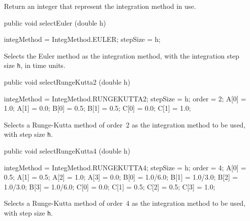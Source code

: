  \begin{tabb}  Return an integer that represent the integration method in use.
 \end{tabb}
\begin{htmlonly}
\end{htmlonly}
\begin{code}

   public void selectEuler (double h)\begin{hide} {
      integMethod = IntegMethod.EULER;
      stepSize = h;
   }\end{hide}
\end{code}
 \begin{tabb}  Selects the Euler method as the integration method,
  with the integration step size \texttt{h}, in time units.
 \end{tabb}
\begin{htmlonly}
\end{htmlonly}
\begin{code}

   public void selectRungeKutta2 (double h)\begin{hide} {
      integMethod = IntegMethod.RUNGEKUTTA2;
      stepSize = h;
      order = 2;
      A[0] = 1.0;  A[1] = 0.0;
      B[0] = 0.5;  B[1] = 0.5;
      C[0] = 0.0;  C[1] = 1.0;
   }\end{hide}
\end{code}
 \begin{tabb}  Selects a Runge-Kutta method of order~2 as the integration
  method to be used, with step size \texttt{h}.
 \end{tabb}
\begin{htmlonly}
\end{htmlonly}
\begin{code}

   public void selectRungeKutta4 (double h)\begin{hide} {
      integMethod = IntegMethod.RUNGEKUTTA4;
      stepSize = h;
      order = 4;
      A[0] = 0.5;  A[1] = 0.5;  A[2] = 1.0;  A[3] = 0.0;
      B[0] = 1.0/6.0;   B[1] = 1.0/3.0;
      B[2] = 1.0/3.0;   B[3] = 1.0/6.0;
      C[0] = 0.0;  C[1] = 0.5;  C[2] = 0.5;  C[3] = 1.0;
   }\end{hide}
\end{code}
 \begin{tabb}  Selects a Runge-Kutta method of order~4 as the integration
  method to be used, with step size \texttt{h}.
 \end{tabb}
\begin{htmlonly}
\end{htmlonly}


